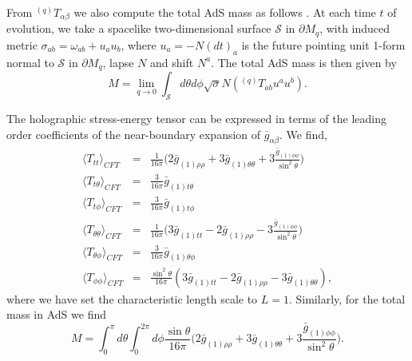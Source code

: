 \documentclass[a4paper,11pt]{article}
\numberwithin{equation}{section}
\begin{document}
From $^{(q)}T_{\alpha\beta}$ we also compute the total AdS mass as follows \cite{Balasubramanian:1999re}. At each time $t$ of evolution, we take a spacelike two-dimensional surface $\mathcal{S}$ in $\partial M_q$, with induced metric $\sigma_{ab}=\omega_{ab}+u_a u_b$, where $u_a=-N(dt)_a$ is the future pointing unit 1-form normal to $\mathcal{S}$ in $\partial M_q$, lapse $N$ and shift $N^a$. The total AdS mass is then given by
\begin{equation}
M=\lim_{q\to0}\int_{\mathcal{S}} d\theta d\phi \sqrt{\sigma} N ( ^{(q)}T_{ab} u^a u^b).
\end{equation}

The holographic stress-energy tensor can be expressed in terms of the leading order coefficients of the near-boundary expansion of $\bar{g}_{\alpha\beta}$. We find,
\begin{eqnarray}
\label{eq:set_explicit}
\langle T_{tt}\rangle_{CFT}&=&\frac{1}{16\pi} \biggl(2\bar{g}_{(1)\rho\rho}+3\bar{g}_{(1)\theta\theta}+3\frac{\bar{g}_{(1)\phi\phi}}{\sin^2\theta}\biggr) \nonumber \\
\langle T_{t\theta}\rangle_{CFT}&=&\frac{3}{16\pi}\bar{g}_{(1)t\theta} \nonumber \\
\langle T_{t\phi}\rangle_{CFT}&=&\frac{3}{16\pi}\bar{g}_{(1)t\phi} \nonumber \\
\langle T_{\theta\theta}\rangle_{CFT}&=&\frac{1}{16\pi} \biggl(3\bar{g}_{(1)tt}-2\bar{g}_{(1)\rho\rho}-3\frac{\bar{g}_{(1)\phi\phi}}{\sin^2\theta}\biggr) \nonumber \\
\langle T_{\theta\phi}\rangle_{CFT}&=&\frac{3}{16\pi}\bar{g}_{(1)\theta\phi} \nonumber \\
\langle T_{\phi\phi}\rangle_{CFT}&=&\frac{\sin^2\theta}{16\pi} (3\bar{g}_{(1)tt}-2\bar{g}_{(1)\rho\rho}-3\bar{g}_{(1)\theta\theta}),
\end{eqnarray}
where we have set the characteristic length scale to $L=1$. 
Similarly, for the total mass in AdS we find
\begin{equation}
\label{eq:AdSmasscalc}
M=\int_0^\pi d\theta \int_0^{2\pi}d\phi\frac{\sin\theta}{16\pi} \biggl(2\bar{g}_{(1)\rho\rho}+3\bar{g}_{(1)\theta\theta}+3\frac{\bar{g}_{(1)\phi\phi}}{\sin^2\theta}\biggr).
\end{equation}
\end{document}
